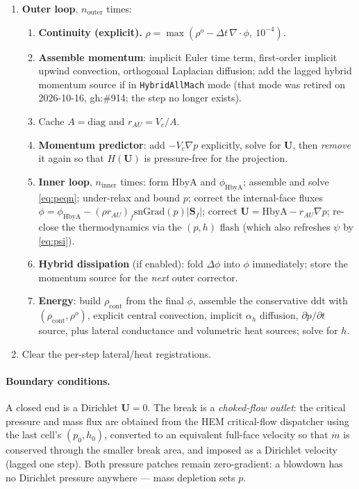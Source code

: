 \documentclass[11pt,a4paper]{article}
\newcommand{\Sf}{\mathbf{S}_f}
\newcommand{\uvec}{\mathbf{U}}
\newcommand{\dt}{\Delta t}
\newcommand{\rhocont}{\rho_{\mathrm{cont}}}
\begin{document}
\begin{enumerate}[leftmargin=*]
  \item \textbf{Outer loop}, $n_{\text{outer}}$ times:
  \begin{enumerate}
    \item \textbf{Continuity (explicit).}
          $\rho = \max(\rho^{o} - \dt\,\nabla\!\cdot\!\phi,\ 10^{-4})$.
    \item \textbf{Assemble momentum}: implicit Euler time term, first-order
          implicit upwind convection, orthogonal Laplacian diffusion; add the
          lagged hybrid momentum source if in \texttt{HybridAllMach} mode
          (that mode was retired on 2026-10-16, gh:\#914; the step no longer
          exists).
    \item Cache $A = \mathrm{diag}$ and $r_{AU} = V_c/A$.
    \item \textbf{Momentum predictor}: add $-V_c\nabla p$ explicitly, solve for
          $\uvec$, then \emph{remove} it again so that $H(\uvec)$ is
          pressure-free for the projection.
    \item \textbf{Inner loop}, $n_{\text{inner}}$ times:
          form $\mathrm{HbyA}$ and $\phi_{\mathrm{HbyA}}$; assemble and solve
          \eqref{eq:peqn}; under-relax and bound $p$; correct the internal-face
          fluxes $\phi = \phi_{\mathrm{HbyA}} - (\rho r_{AU})_f
          \mathrm{snGrad}(p)|\Sf|$; correct
          $\uvec = \mathrm{HbyA} - r_{AU}\nabla p$; re-close the thermodynamics
          via the $(p,h)$ flash (which also refreshes $\psi$ by \eqref{eq:psi}).
    \item \textbf{Hybrid dissipation} (if enabled): fold $\Delta\phi$ into
          $\phi$ immediately; store the momentum source for the \emph{next}
          outer corrector.
    \item \textbf{Energy}: build $\rhocont$ from the final $\phi$, assemble
          the conservative $\mathrm{ddt}$ with $(\rhocont,\rho^{o})$, explicit
          central convection, implicit $\alpha_h$ diffusion, $\partial p/\partial t$
          source, plus lateral conductance and volumetric heat sources; solve for $h$.
  \end{enumerate}
  \item Clear the per-step lateral/heat registrations.
\end{enumerate}

\paragraph{Boundary conditions.} A closed end is a Dirichlet $\uvec = 0$. The
break is a \emph{choked-flow outlet}: the critical pressure and mass flux are
obtained from the HEM critical-flow dispatcher using the last cell's $(p_0,h_0)$,
converted to an equivalent full-face velocity so that $\dot m$ is conserved
through the smaller break area, and imposed as a Dirichlet velocity (lagged one
step). Both pressure patches remain zero-gradient: a blowdown has no Dirichlet
pressure anywhere --- mass depletion sets $p$.
\end{document}

